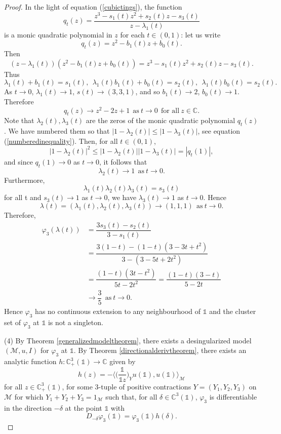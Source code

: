 \documentclass[11pt, reqno]{amsart}
\newcommand\1{\boldsymbol {1}}
\numberwithin{equation}{section}
\begin{document}
\begin{proof}
In the light of equation (\ref{cubictings}), the function
$$q_{t}(z)=\dfrac{z^{3}-s_{1}(t)z^{2}+s_{2}(t)z-s_{3}(t)}{z-\lambda_{1}(t)}$$
is a monic quadratic polynomial in $z$ for each $t\in(0,1)$: let us write 
$$q_{t}(z)=z^{2}-b_{1}(t)z+b_{0}(t).$$
Then
$$(z-\lambda_{1}(t))(z^{2}-b_{1}(t)z+b_{0}(t)) = z^{3}-s_{1}(t)z^{2}+s_{2}(t)z-s_{3}(t).$$
Thus 
$$\lambda_{1}(t)+b_{1}(t)=s_{1}(t),~~\lambda_{1}(t)b_{1}(t)+b_{0}(t)=s_{2}(t),~~\lambda_{1}(t)b_{0}(t)=s_{2}(t).$$
As $t\rightarrow 0$, $\lambda_{1}(t)\rightarrow 1$, $s(t)\rightarrow (3,3,1)$, and so $b_{1}(t)\rightarrow 2$, $b_{0}(t)\rightarrow 1$. Therefore 
$$q_{t}(z)\rightarrow z^{2}-2z+1~~\text{as}~t\rightarrow 0~~\text{for all}~z\in\mathbb{C}.$$
Note that $\lambda_{2}(t),\lambda_{3}(t)$ are the zeros of the monic quadratic polynomial $q_{t}(z)$. We have numbered them so that $|1-\lambda_{2}(t)|\leq |1-\lambda_{3}(t)|$, see equation (\ref{numberedinequality}). Then, for all $t\in(0,1)$, 
$$|1-\lambda_{2}(t)|^{2}\leq |1-\lambda_{2}(t)||1-\lambda_{3}(t)|=|q_{t}(1)|,$$
and since $q_{t}(1)\rightarrow 0$ as $t\rightarrow 0$, it follows that 
$$\lambda_{2}(t)\rightarrow 1~~\text{as}~t\rightarrow 0.$$
Furthermore, 
$$\lambda_{1}(t)\lambda_{2}(t)\lambda_{3}(t) = s_{3}(t)$$
for all t and $s_{3}(t)\rightarrow 1$ as $t\rightarrow 0$, we have $\lambda_{3}(t)\rightarrow 1$ as $t\rightarrow 0$. Hence
$$\lambda(t)=(\lambda_{1}(t),\lambda_{2}(t),\lambda_{3}(t))\rightarrow (1,1,1)~~\text{as}~t\rightarrow 0.$$
Therefore,
\begin{align*}
    \varphi_3(\lambda(t))&=\dfrac{3s_{3}(t)-s_{2}(t)}{3-s_{1}(t)} \\
    &=\dfrac{3(1-t)-(1-t)(3-3t+t^{2})}{3-(3-5t+2t^{2})}\\
    &=\dfrac{(1-t)(3t-t^{2})}{5t-2t^{2}}=\dfrac{(1-t)(3-t)}{5-2t}\\
    &\rightarrow \dfrac{3}{5}~~\text{as}~t\rightarrow 0.
\end{align*}
Hence $\varphi_3$ has no continuous extension to any neighbourhood of $\mathds{1}$ and the cluster set of 
$\varphi_3$ at $\mathds{1}$ is not a singleton.

(4)  By Theorem \ref{generalizedmodeltheorem}, there exists a desingularized model $(\mathcal{M},u,I)$ for $\varphi_3$ at $\mathds{1}$. By Theorem \ref{directionalderivtheorem}, there exists an analytic function $h:\mathbb{C}^{3}_{+}(\mathds{1})\rightarrow\mathbb{C}$ given by
$$
h(z)=-\bigg\langle \bigg(\dfrac{\mathds{1}}{\mathds{1}z}\bigg)_{Y}u(\mathds{1}),u(\mathds{1})\bigg\rangle_{\mathcal{M}}
$$
for all $z\in\mathbb{C}^{3}_{+}(\mathds{1})$, for some $3$-tuple of positive contractions $Y=(Y_{1}, Y_{2},Y_{3})$ on $\mathcal{M}$ for which $Y_{1}+Y_{2}+Y_{3}=1_{\mathcal{M}}$ such that, for all $\delta\in\mathbb{C}^{3}(\mathds{1})$, $\varphi_3$ is differentiable in the direction $-\delta$ at the point $\mathds{1}$ with 
$$
D_{-\delta}\varphi_3(\mathds{1})=\varphi_3(\mathds{1})h(\delta).
$$
\end{proof}
\end{document}
